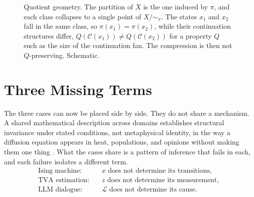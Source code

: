\documentclass[11pt]{article}
\theoremstyle{definition}
\theoremstyle{remark}
\begin{document}
\begin{figure}[t]
\centering
{}
\caption{Quotient geometry. The partition of $X$ is the one induced by $\pi$, and each class collapses to a single point of $X/{\sim_\pi}$. The states $x_1$ and $x_2$ fall in the same class, so $\pi(x_1)=\pi(x_2)$, while their continuation structures differ, $Q(\mathcal{C}(x_1)) \neq Q(\mathcal{C}(x_2))$ for a property $Q$ such as the size of the continuation fan. The compression is then not $Q$-preserving. Schematic.}
\label{fig:quotient}
\end{figure}

\section{Three Missing Terms}

The three cases can now be placed side by side. They do not share a mechanism. A shared mathematical description across domains establishes structural invariance under stated conditions, not metaphysical identity, in the way a diffusion equation appears in heat, populations, and opinions without making them one thing \cite{flyxion-clipboard}. What the cases share is a pattern of inference that fails in each, and each failure isolates a different term.
\begin{align}
\text{Ising machine:}&\quad x \text{ does not determine its transitions,}\\
\text{TVA estimation:}&\quad z \text{ does not determine its measurement,}\\
\text{LLM dialogue:}&\quad \mathcal{L} \text{ does not determine its cause.}
\end{align}
\end{document}
